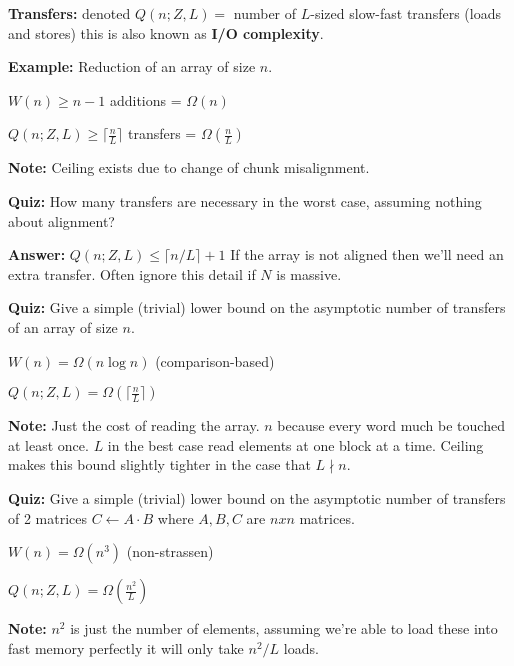 \documentclass[../main.tex]{subfiles}
\begin{document}
	\textbf{Transfers:} denoted $Q(n;Z,L)=$ number of $L$-sized slow-fast transfers (loads and stores) this is also known as \textbf{I/O complexity}.
	\begin{mdframed}[style=Example]
		\textbf{Example:} Reduction of an array of size $n$.
		\vspace{2mm}
		
		$W(n) \geq n-1$ additions = $\Omega(n)$
		
		$Q(n;Z,L) \geq \lceil\frac{n}{L}\rceil$ transfers = $\Omega(\frac{n}{L})$
		\vspace{2mm}
		
		\noindent
		\textbf{Note:} Ceiling exists due to change of chunk misalignment.
	\end{mdframed}
	\begin{mdframed}[style=Quiz]
		\textbf{Quiz:} How many transfers are necessary in the worst case, assuming nothing about alignment?
		\vspace{2mm}
		
		\noindent
		\textbf{Answer:} $Q(n;Z,L) \leq \lceil n/L \rceil + 1$  If the array is not aligned then we'll need an extra transfer. Often ignore this detail if $N$ is massive.
	\end{mdframed}
	\begin{mdframed}[style=Quiz]
		\textbf{Quiz:} Give a simple (trivial) lower bound on the asymptotic number of transfers of an array of size $n$.
		\vspace{2mm}
		
		$W(n) = \Omega(n\log n)$ (comparison-based)
		
		$Q(n;Z,L) = \Omega(\lceil\frac{n}{L}\rceil)$
		\vspace{2mm}
		
		\noindent
		\textbf{Note:} Just the cost of reading the array. \textbf{$n$} because every word much be touched at least once. \textbf{$L$} in the best case read elements at one block at a time.  Ceiling makes this bound slightly tighter in the case that $L \nmid n$.
	\end{mdframed}
	\begin{mdframed}[style=Quiz]
		\textbf{Quiz:} Give a simple (trivial) lower bound on the asymptotic number of transfers of 2 matrices $C \leftarrow A \cdot B$ where $A, B, C$ are $nxn$ matrices.
		\vspace{2mm}
		
		$W(n) = \Omega(n^3)$ (non-strassen)
		
		$Q(n;Z,L) = \Omega(\frac{n^2}{L})$
		\vspace{2mm}
		
		\noindent
		\textbf{Note:} $n^2$ is just the number of elements, assuming we're able to load these into fast memory perfectly it will only take $n^2/L$ loads.
	\end{mdframed}
	\vspace{2mm}
\end{document}
